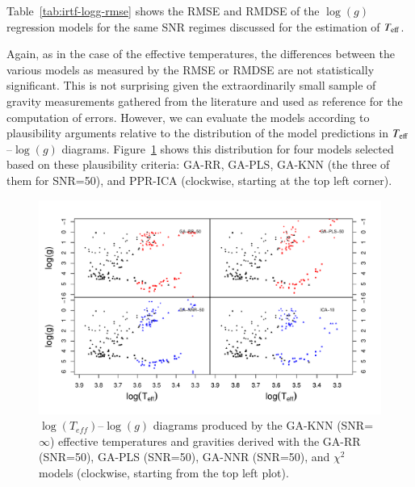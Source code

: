 Table~\ref{tab:irtf-logg-rmse} shows the RMSE and RMDSE of the
$\log(g)$ regression models for the same SNR regimes discussed for the
estimation of $T_{\rm eff}$.

Again, as in the case of the effective temperatures, the differences
between the various models as measured by the RMSE or RMDSE are not
statistically significant.  This is not surprising given the
extraordinarily small sample of gravity measurements gathered from the
literature and used as reference for the computation of errors.
However, we can evaluate the models according to plausibility
arguments relative to the distribution of the model predictions in
$T_{\rm eff}$--$\log(g)$ diagrams.  Figure~\ref{fig:lt_lg_ga} shows
this distribution for four models selected based on these plausibility
criteria: GA-RR, GA-PLS, GA-KNN (the three of them for SNR=50), and
PPR-ICA (clockwise, starting at the top left corner).

\begin{figure}
 \begin{center}
   \includegraphics[width=\textwidth]{figs/ordieres-fig4.pdf}

\caption{$\log(T_{eff})$--$\log(g)$ diagrams produced by the GA-KNN
   (SNR=$\infty$) effective temperatures and gravities derived with
   the GA-RR (SNR=50), GA-PLS (SNR=50), GA-NNR (SNR=50), and $\chi^2$
   models (clockwise, starting from the top left plot).}

\label{fig:lt_lg_ga}
 \end{center}
\end{figure}

